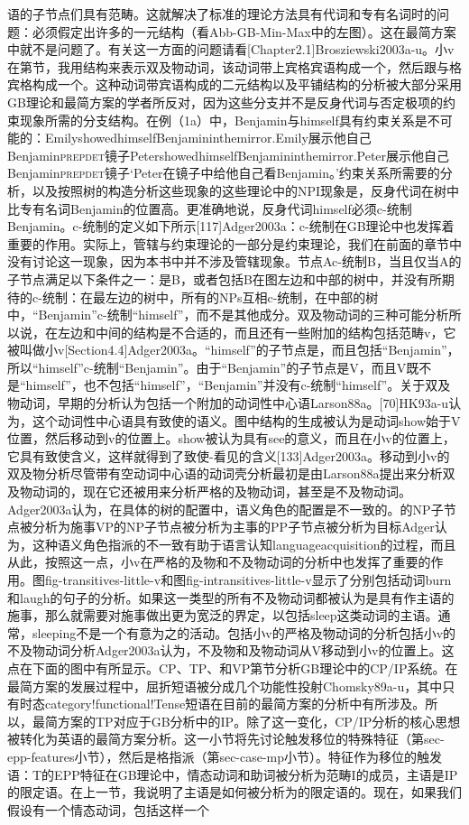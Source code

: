 语的子节点们具有范畴。这就解决了标准的理论方法具有代词和专有名词时的问题：必须假定出许多的一元结构（看Abb-GB-Min-Max中的左图）。这在最简方案中就不是问题了。有关这一方面的问题请看[Chapter2.1]Brosziewski2003a-u。小v在第节，我用结构来表示双及物动词，该动词带上宾格宾语构成一个，然后跟与格宾格构成一个。这种动词带宾语构成的二元结构以及平铺结构的分析被大部分采用GB理论和最简方案的学者所反对，因为这些分支并不是反身代词与否定极项的约束现象所需的分支结构。在例（1a）中，Benjamin与himself具有约束关系是不可能的：EmilyshowedhimselfBenjamininthemirror.Emily展示他自己Benjamin\textsc{prep}\textsc{det}镜子PetershowedhimselfBenjamininthemirror.Peter展示他自己Benjamin\textsc{prep}\textsc{det}镜子`Peter在镜子中给他自己看Benjamin。'约束关系所需要的分析，以及按照树的构造分析这些现象的这些理论中的NPI现象是，反身代词在树中比专有名词Benjamin的位置高。更准确地说，反身代词himself必须c-统制Benjamin。c-统制的定义如下所示[117]Adger2003a：c-统制在GB理论中也发挥着重要的作用。实际上，管辖与约束理论的一部分是约束理论，我们在前面的章节中没有讨论这一现象，因为本书中并不涉及管辖现象。节点Ac-统制B，当且仅当A的子节点满足以下条件之一：是B，或者包括B在图左边和中部的树中，并没有所期待的c-统制：在最左边的树中，所有的NPs互相c-统制，在中部的树中，“Benjamin”c-统制“himself”，而不是其他成分。双及物动词的三种可能分析所以说，在左边和中间的结构是不合适的，而且还有一些附加的结构包括范畴v，它被叫做小v[Section4.4]Adger2003a。“himself”的子节点是，而且包括“Benjamin”，所以“himself”c-统制“Benjamin”。由于“Benjamin”的子节点是V，而且V既不是“himself”，也不包括“himself”，“Benjamin”并没有c-统制“himself”。关于双及物动词，早期的分析认为包括一个附加的动词性中心语Larson88a。[70]HK93a-u认为，这个动词性中心语具有致使的语义。图中结构的生成被认为是动词show始于V位置，然后移动到v的位置上。show被认为具有see的意义，而且在小v的位置上，它具有致使含义，这样就得到了致使-看见的含义[133]Adger2003a。移动到小v的双及物分析尽管带有空动词中心语的动词壳分析最初是由Larson88a提出来分析双及物动词的，现在它还被用来分析严格的及物动词，甚至是不及物动词。Adger2003a认为，在具体的树的配置中，语义角色的配置是不一致的。的NP子节点被分析为施事VP的NP子节点被分析为主事的PP子节点被分析为目标Adger认为，这种语义角色指派的不一致有助于语言认知languageacquisition的过程，而且从此，按照这一点，小v在严格的及物和不及物动词的分析中也发挥了重要的作用。图fig-transitives-little-v和图fig-intransitives-little-v显示了分别包括动词burn和laugh的句子的分析。如果这一类型的所有不及物动词都被认为是具有作主语的施事，那么就需要对施事做出更为宽泛的界定，以包括sleep这类动词的主语。通常，sleeping不是一个有意为之的活动。包括小v的严格及物动词的分析包括小v的不及物动词分析Adger2003a认为，不及物和及物动词从V移动到小v的位置上。这点在下面的图中有所显示。CP、TP、和VP第节分析GB理论中的CP/IP系统。在最简方案的发展过程中，屈折短语被分成几个功能性投射Chomsky89a-u，其中只有时态category!functional!Tense短语在目前的最简方案的分析中有所涉及。所以，最简方案的TP对应于GB分析中的IP。除了这一变化，CP/IP分析的核心思想被转化为英语的最简方案分析。这一小节将先讨论触发移位的特殊特征（第sec-epp-features小节），然后是格指派（第sec-case-mp小节）。特征作为移位的触发语：T的EPP特征在GB理论中，情态动词和助词被分析为范畴I的成员，主语是IP的限定语。在上一节，我说明了主语是如何被分析为的限定语的。现在，如果我们假设有一个情态动词，包括这样一个